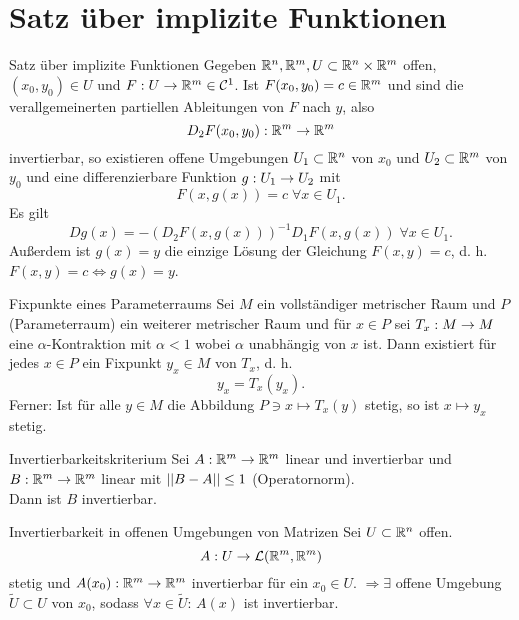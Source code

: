 \documentclass[main.tex]{subfiles}
\begin{document}
\section*{Satz über implizite Funktionen}

\begin{karte}{Satz über implizite Funktionen}
    Gegeben \( \mathbb{R}^n, \mathbb{R}^m, U \subset \mathbb{R}^n \times \mathbb{R}^m \) 
    offen, \( (x_0,y_0)\in U \) und \( F : U \rightarrow \mathbb{R}^m \in \mathcal{C}^1 \). 
    Ist \( F(x_0, y_0) = c\in \mathbb{R}^m \) und sind die verallgemeinerten partiellen 
    Ableitungen von \( F \) nach \( y \), also 
    \[ D_2 F(x_0, y_0) : \mathbb{R}^m \rightarrow \mathbb{R}^m \] 
    invertierbar, so existieren offene Umgebungen \( U_1 \subset \mathbb{R}^n \) 
    von \(x_0\) und \( U_2 \subset \mathbb{R}^m \) von \(y_0\) und eine 
    differenzierbare Funktion \( g : U_1 \rightarrow U_2 \) mit 
    \[ F(x, g(x)) = c \;\forall x\in U_1. \]
    Es gilt 
    \[ Dg(x) = -(D_2 F(x,g(x)))^{-1} D_1 F(x,g(x)) \;\forall x\in U_1. \]
    Außerdem ist \( g(x) = y \) die einzige Lösung der Gleichung 
    \( F(x,y) = c \), d. h. \( F(x,y) = c \Leftrightarrow g(x) = y \).
\end{karte}

\begin{karte}{Fixpunkte eines Parameterraums}
    Sei \( M \) ein vollständiger metrischer Raum und \( P \) 
    (Parameterraum) ein weiterer metrischer Raum und für \( x\in P \)     
    sei \(T_x : M \rightarrow M\) eine \(\alpha\)-Kontraktion mit \(\alpha < 1\)
    wobei \(\alpha\) unabhängig von \(x\) ist. Dann existiert für jedes \(x \in P\)
    ein Fixpunkt \(y_x \in M\) von \(T_x\), d. h. 
    \[ y_x = T_x(y_x). \]
    Ferner: Ist für alle \(y \in M\) die Abbildung 
    \(P \ni x \mapsto T_x(y)\) stetig, so ist
    \( x \mapsto y_x \) stetig.
\end{karte}

\begin{karte}{Invertierbarkeitskriterium}
    Sei \( A : \mathbb{R}^m \rightarrow \mathbb{R}^m \) linear und 
    invertierbar und \( B : \mathbb{R}^m \rightarrow \mathbb{R}^m \) 
    linear mit \(\left|\left|B-A\right|\right| \leq 1\) (Operatornorm). \\
    Dann ist \( B \) invertierbar.
\end{karte}

\begin{karte}{Invertierbarkeit in offenen Umgebungen von Matrizen}
    Sei \( U \subset \mathbb{R}^n \) offen. 
    \[ A : U \rightarrow \mathcal{L}(\mathbb{R}^m, \mathbb{R}^m) \]
    stetig und \( A(x_0) : \mathbb{R}^m \rightarrow \mathbb{R}^m \) invertierbar 
    für ein \( x_0 \in U \). \( \Rightarrow \exists \) offene Umgebung 
    \( \tilde{U} \subset U \) von \( x_0 \), sodass \( \forall x \in \tilde{U} \): 
    \( A(x) \) ist invertierbar.
\end{karte}
\end{document}
